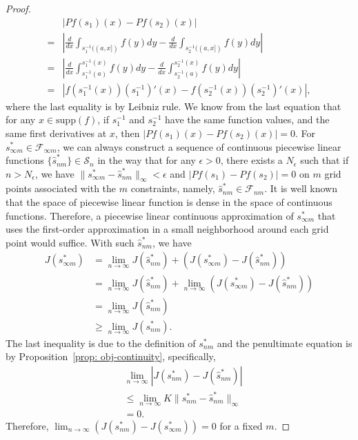 \documentclass[12pt,leqno]{amsart}
\begin{document}
\begin{proof}
\begin{align*}
    &\left|Pf(s_1)(x) - Pf(s_2)(x)\right|\\
    =&\left|\frac{d}{dx}\int_{s_1^{-1}((a, x])} f(y)dy - \frac{d}{dx}\int_{s_2^{-1}((a, x])} f(y)dy\right|\\
    =&\left|\frac{d}{dx}\int_{s_1^{-1}(a)}^{s_1^{-1}(x)} f(y)dy - \frac{d}{dx}\int_{s_2^{-1}(a)}^{s_2^{-1}(x)} f(y)dy\right|\\
    =&\left|f(s_1^{-1}(x))(s_1^{-1})'(x) - f(s_2^{-1}(x))(s_2^{-1})'(x) \right|,
\end{align*}
where the last equality is by Leibniz rule. We know from the last equation that for any $x\in \mathrm{supp}(f)$, if $s_1^{-1}$ and $s_2^{-1}$ have the same function values, and the same first derivatives at $x$, then $\left|Pf(s_1)(x) - Pf(s_2)(x)\right|=0$. For $s_{\infty m}^*\in \mathcal{F}_{\infty m}$, we can always construct a sequence of continuous piecewise linear functions $\{\hat{s}^*_{nm}\}\in\mathcal{S}_n$ in the way that for any $\epsilon>0$, there exists a $N_{\epsilon}$ such that if $n>N_{\epsilon}$, we have 
$\|s_{\infty m}^*-\hat{s}^*_{nm}\|_{\infty}<\epsilon$ and $\left|Pf(s_1) - Pf(s_2)\right|=0$ on $m$ grid points associated with the $m$ constraints, namely, $\hat{s}^*_{nm}\in \mathcal{F}_{nm}$. It is well known that the space of piecewise linear function is dense in the space of continuous functions. Therefore, a piecewise linear continuous approximation of  $s_{\infty m}^*$ that uses the first-order approximation in a small neighborhood around each grid point would suffice.
With such $\hat{s}^*_{nm}$, we have
   \begin{align*}
       J(s_{\infty m}^*) &= \lim_{n\rightarrow\infty} J(\hat{s}^*_{nm}) + (J(s_{\infty m}^*)-J(\hat{s}^*_{nm}))\\
       &= \lim_{n\rightarrow\infty} J(\hat{s}^*_{nm}) + \lim_{n\rightarrow\infty} (J(s_{\infty m}^*)-J(\hat{s}^*_{nm}))\\
       &=\lim_{n\rightarrow\infty} J(\hat{s}^*_{nm})\\
       &\geq \lim_{n\rightarrow\infty} J(s_{nm}^*).
   \end{align*}
The last inequality is due to the definition of $s_{nm}^*$ and the penultimate equation is by Proposition~\ref{prop: obj-continuity}, specifically,
\begin{align*}
    &\lim_{n\rightarrow\infty}|J(s_{nm}^*)-J(\hat{s}^*_{nm})|\\
    &\leq\lim_{n\rightarrow\infty}K\|s_{nm}^*-\hat{s}^*_{nm}\|_{\infty}\\
    &=0.
\end{align*}
Therefore, $\lim_{n\rightarrow\infty}(J(s_{nm}^*)-J(s_{\infty m}^*))=0$ for a fixed $m$.


\end{proof}
\end{document}
